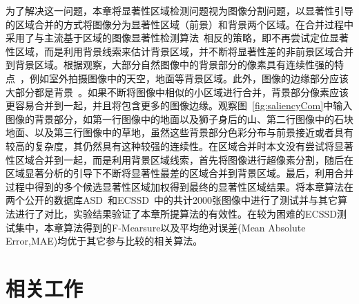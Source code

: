 \par
为了解决这一问题，本章将显著性区域检测问题视为图像分割问题，以显著性引导的区域合并的方式将图像分为显著性区域（前景）和背景两个区域。在合并过程中采用了与主流基于区域的图像显著性检测算法~\cite{Achanta08,ChengPAMI,ufo,Yan2014Hierarchical}相反的策略，即不再尝试定位显著性区域，而是利用背景线索来估计背景区域，并不断将显著性差的非前景区域合并到背景区域。根据观察，大部分自然图像中的背景部分的像素具有连续性强的特点~\cite{huamiao}，例如室外拍摄图像中的天空，地面等背景区域。此外，图像的边缘部分应该大部分都是背景~\cite{backgroundPrior}。如果不断将图像中相似的小区域进行合并，背景部分像素应该更容易合并到一起，并且将包含更多的图像边缘。观察图~\ref{fig:saliencyCom}中输入图像的背景部分，如第一行图像中的地面以及狮子身后的山、第二行图像中的石块地面、以及第三行图像中的草地，虽然这些背景部分色彩分布与前景接近或者具有较高的复杂度，其仍然具有这种较强的连续性。在区域合并时本文没有尝试将显著性区域合并到一起，而是利用背景区域线索，首先将图像进行超像素分割，随后在区域显著分析的引导下不断将显著性最差的区域合并到背景区域。最后，利用合并过程中得到的多个候选显著性区域加权得到最终的显著性区域结果。将本章算法在两个公开的数据库ASD~\cite{Achanta08}和ECSSD~\cite{ECSSD}中的共计2000张图像中进行了测试并与其它算法进行了对比，实验结果验证了本章所提算法的有效性。在较为困难的ECSSD测试集中，本章算法得到的F-Mearsure以及平均绝对误差(Mean Absolute Error,MAE)均优于其它参与比较的相关算法。

\section{相关工作}
\label{sec:relatedWorks}
